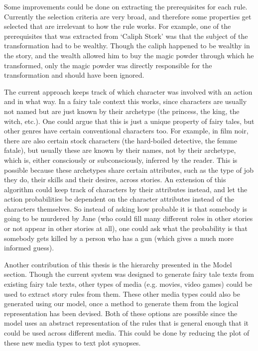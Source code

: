 Some improvements could be done on extracting the prerequisites for each rule.
Currently the selection criteria are very broad, and therefore some properties
get selected that are irrelevant to how the rule works. For example, one of the
prerequisites that was extracted from `Caliph Stork' was that the subject of the
transformation had to be wealthy. Though the caliph happened to be wealthy in
the story, and the wealth allowed him to buy the magic powder through which he
transformed, only the magic powder was directly responsible for the
transformation and should have been ignored.

The current approach keeps track of which
character was involved with an action and in what way. In a fairy tale context
this works, since characters are usually not named but are just known by their
archetype (the princess, the king, the witch, etc.). One could argue that this
is just a unique property of fairy tales, but other genres have certain
conventional characters
too. For example, in film noir, there are also certain stock characters (the
hard-boiled detective, the femme fatale), but usually these are
known by their names, not by their archetype, which is, either consciously or
subconsciously, inferred by the reader. This is possible because these
archetypes share certain attributes, such as the type of job they do, their
skills and their desires, across stories. An extension of this algorithm
could keep track of characters by their attributes instead, and let the action
probabilities be dependent on the character attributes instead of the characters
themselves. So instead of asking how probable it is that somebody is going to be
murdered by Jane (who could fill many different roles in other stories or not
appear in other stories at all), one could ask what the probability is that somebody gets
killed by a person who has a gun (which gives a much more informed guess).

Another contribution of this thesis is the hierarchy presented in the Model
section. Though the current system was designed to generate fairy tale texts
from existing fairy tale texts, other types of media (e.g. movies, video
games) could be used to extract story rules from them.
These other media types could also be generated using our model, once a method
to generate them from the logical representation has been devised. Both of
these options are possible since the model uses an abstract representation of the
rules that is general enough that it could be used across different media.
This could be done by reducing the plot of these new media types to text plot
synopses.

